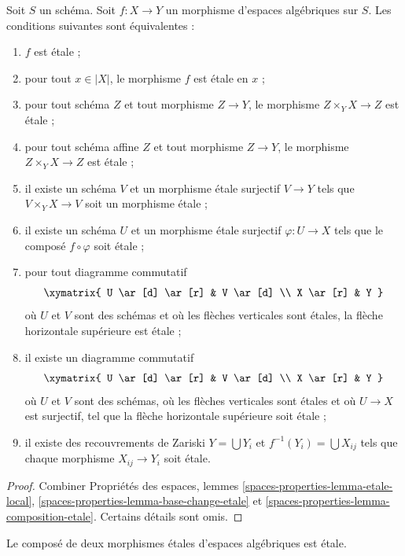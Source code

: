 \begin{lemma}
\label{lemma-etale-local}
Soit $S$ un schéma.
Soit $f : X \to Y$ un morphisme d'espaces algébriques sur $S$.
Les conditions suivantes sont équivalentes :
\begin{enumerate}
\item $f$ est étale ;
\item pour tout $x \in |X|$, le morphisme $f$ est étale en $x$ ;
\item pour tout schéma $Z$ et tout morphisme $Z \to Y$, le morphisme
$Z \times_Y X \to Z$ est étale ;
\item pour tout schéma affine $Z$ et tout morphisme
$Z \to Y$, le morphisme $Z \times_Y X \to Z$ est étale ;
\item il existe un schéma $V$ et un morphisme étale surjectif
$V \to Y$ tels que $V \times_Y X \to V$ soit un morphisme étale ;
\item il existe un schéma $U$ et un morphisme étale surjectif
$\varphi : U \to X$ tels que le composé $f \circ \varphi$
soit étale ;
\item pour tout diagramme commutatif
$$
\xymatrix{
U \ar[d] \ar[r] & V \ar[d] \\
X \ar[r] & Y
}
$$
où $U$ et $V$ sont des schémas et où les flèches verticales sont étales,
la flèche horizontale supérieure est étale ;
\item il existe un diagramme commutatif
$$
\xymatrix{
U \ar[d] \ar[r] & V \ar[d] \\
X \ar[r] & Y
}
$$
où $U$ et $V$ sont des schémas, où les flèches verticales sont étales et où
$U \to X$ est surjectif, tel que la flèche horizontale supérieure soit étale ;
\item il existe des recouvrements de Zariski $Y = \bigcup Y_i$ et
$f^{-1}(Y_i) = \bigcup X_{ij}$ tels que chaque morphisme
$X_{ij} \to Y_i$ soit étale.
\end{enumerate}
\end{lemma}

\begin{proof}
Combiner
Propriétés des espaces, lemmes
\ref{spaces-properties-lemma-etale-local},
\ref{spaces-properties-lemma-base-change-etale} et
\ref{spaces-properties-lemma-composition-etale}.
Certains détails sont omis.
\end{proof}

\begin{lemma}
\label{lemma-composition-etale}
Le composé de deux morphismes étales d'espaces algébriques
est étale.
\end{lemma}

